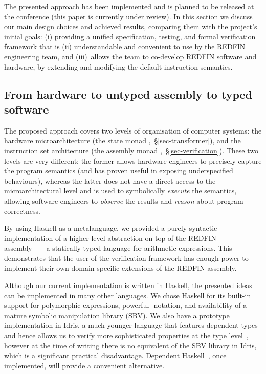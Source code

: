 
The presented approach has been implemented and is planned to be released at the
conference (this paper is currently under review).
In this section we discuss our main design choices and achieved
results, comparing them with the project's initial goals: (i) providing a unified
specification, testing, and formal verification framework that is (ii) understandable
and convenient to use by the REDFIN engineering team, and (iii)~allows the team
to co-develop REDFIN software and hardware, by extending and modifying the
default instruction semantics.

\subsection{From hardware to untyped assembly to typed software}

The proposed approach covers two levels of organisation of computer systems: the
hardware microarchitecture (the state monad ,~\S\ref{sec-transformer}),
and the instruction set architecture (the assembly monad
,~\S\ref{sec-verification}). These two levels are very different: the
former allows hardware engineers to precisely capture the program semantics (and
has proven useful in exposing underspecified behaviours), whereas the latter does
not have a direct access to the microarchitectural level and is used to
symbolically \emph{execute} the semantics, allowing software engineers to
\emph{observe} the results and \emph{reason} about program correctness.

By using Haskell as a metalanguage, we provided a purely syntactic implementation
of a higher-level abstraction on top of the REDFIN assembly~---~a statically-typed
language for arithmetic expressions. This demonstrates that the user
of the verification framework has enough power to implement their own domain-specific
extensions of the REDFIN assembly.

Although our current implementation is written in Haskell, the presented ideas
can be implemented in many other languages. We chose Haskell for its built-in
support for polymorphic expressions, powerful -notation, and availability
of a mature symbolic manipulation library (SBV). We also have a prototype
implementation in Idris, a much younger language that features dependent
types and hence allows us to verify more sophisticated properties at the type
level~\cite{JFP:9060502}, however at the time of writing there is no equivalent
of the SBV library in Idris, which is a significant practical disadvantage.
Dependent Haskell~\cite{weirich2017dependent}, once implemented, will provide
a convenient alternative.


